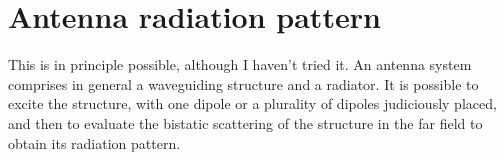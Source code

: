 \documentclass[a4paper,10pt]{book}
\begin{document}
\section{Antenna radiation pattern}
%
\par
This is in principle possible, although I haven't tried it. An antenna system comprises in general a waveguiding structure and a radiator. It is possible to excite the structure, with one dipole or a plurality of dipoles judiciously placed, and then to evaluate the bistatic scattering of the structure in the far field to obtain its radiation pattern.



\end{document}
